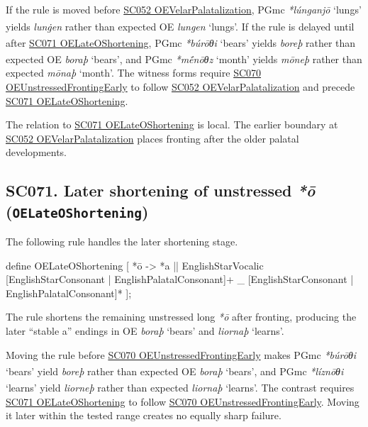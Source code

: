 \documentclass[
  british,
  a4paper,
  openany]{book}
\providecommand{\Pred}[1]{\textsuperscript{\dag}\emph{#1}}
\providecommand{\Recon}[1]{\emph{*#1}}
{\catcode`→=\active \global\def→{\ensuremath{\rightarrow}}}
\providecommand{\texorpdfstring}[2]{#1}
\providecommand{\Pred}[1]{\textsuperscript{\dag}\emph{#1}}
\providecommand{\Recon}[1]{\emph{*#1}}
{\catcode`→=\active \global\def→{\ensuremath{\rightarrow}}}
\begin{document}
If the rule is moved before \hyperref[rule-OEVelarPalatalization]{SC052
OEVelarPalatalization}, PGmc \Recon{lúnganjō} `lungs' yields
\Pred{lunġen} rather than expected OE \emph{lungen} `lungs'. If the rule
is delayed until after \hyperref[rule-OELateOShortening]{SC071
OELateOShortening}, PGmc \Recon{búrōθi} `bears' yields \Pred{boreþ}
rather than expected OE \emph{boraþ} `bears', and PGmc \Recon{mḗnōθz}
`month' yields \Pred{mōneþ} rather than expected \emph{mōnaþ} `month'.
The witness forms require
\hyperref[rule-OEUnstressedFrontingEarly]{SC070
OEUnstressedFrontingEarly} to follow
\hyperref[rule-OEVelarPalatalization]{SC052 OEVelarPalatalization} and
precede \hyperref[rule-OELateOShortening]{SC071 OELateOShortening}.

The relation to \hyperref[rule-OELateOShortening]{SC071
OELateOShortening} is local. The earlier boundary at
\hyperref[rule-OEVelarPalatalization]{SC052 OEVelarPalatalization}
places fronting after the older palatal developments.

\subsection{\texorpdfstring{SC071. Later shortening of unstressed
\emph{*ō}
(\texttt{OELateOShortening})}{SC071. Later shortening of unstressed  (OELateOShortening)}}\label{rule-OELateOShortening}

The following rule handles the later shortening stage.

\begin{ReaderFacingFoma}
define OELateOShortening [
    {*ō} -> {*a} || EnglishStarVocalic [EnglishStarConsonant | EnglishPalatalConsonant]+ _ [EnglishStarConsonant | EnglishPalatalConsonant]*
];
\end{ReaderFacingFoma}

The rule shortens the remaining unstressed long \emph{*ō} after
fronting, producing the later ``stable a'' endings in OE \emph{boraþ}
`bears' and \emph{liornaþ} `learns'.

Moving the rule before \hyperref[rule-OEUnstressedFrontingEarly]{SC070
OEUnstressedFrontingEarly} makes PGmc \Recon{búrōθi} `bears' yield
\Pred{boreþ} rather than expected OE \emph{boraþ} `bears', and PGmc
\Recon{líznōθi} `learns' yield \Pred{liorneþ} rather than expected
\emph{liornaþ} `learns'. The contrast requires
\hyperref[rule-OELateOShortening]{SC071 OELateOShortening} to follow
\hyperref[rule-OEUnstressedFrontingEarly]{SC070
OEUnstressedFrontingEarly}. Moving it later within the tested range
creates no equally sharp failure.
\end{document}
